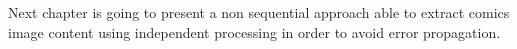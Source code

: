 

Next chapter is going to present a non sequential approach able to extract comics image content using independent processing in order to avoid error propagation.



